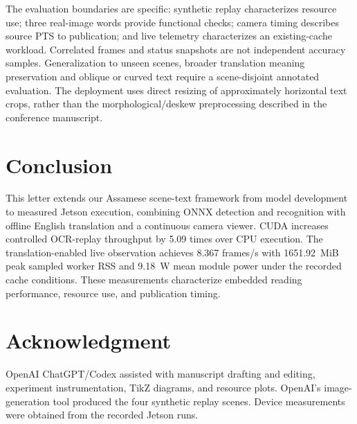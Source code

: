 \documentclass[cspaper,journal,10pt]{IEEEtran}
\begin{document}
The evaluation boundaries are specific: synthetic replay characterizes resource use; three real-image words provide functional checks; camera timing describes source PTS to publication; and live telemetry characterizes an existing-cache workload. Correlated frames and status snapshots are not independent accuracy samples. Generalization to unseen scenes, broader translation meaning preservation and oblique or curved text require a scene-disjoint annotated evaluation. The deployment uses direct resizing of approximately horizontal text crops, rather than the morphological/deskew preprocessing described in the conference manuscript.

\balance
\section{Conclusion}
This letter extends our Assamese scene-text framework from model development to measured Jetson execution, combining ONNX detection and recognition with offline English translation and a continuous camera viewer. CUDA increases controlled OCR-replay throughput by 5.09 times over CPU execution. The translation-enabled live observation achieves 8.367 frames/s with 1651.92~MiB peak sampled worker RSS and 9.18~W mean module power under the recorded cache conditions. These measurements characterize embedded reading performance, resource use, and publication timing.

\section*{Acknowledgment}
OpenAI ChatGPT/Codex assisted with manuscript drafting and editing, experiment instrumentation, TikZ diagrams, and resource plots. OpenAI's image-generation tool produced the four synthetic replay scenes. Device measurements were obtained from the recorded Jetson runs.
\end{document}
